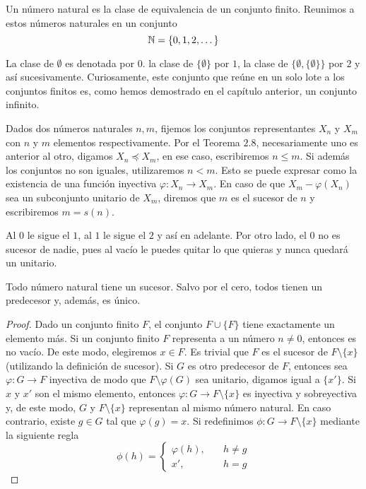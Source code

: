 \documentclass[main.tex]{subfiles}
\begin{document}
\begin{defn}
    Un n\'umero natural es la clase de equivalencia de un conjunto finito. Reunimos a estos n\'umeros naturales en un conjunto
    $$\mathbb N = \{0, 1, 2, \dots\}$$
\end{defn}

La clase de $\emptyset$ es denotada por $0$. la clase de $\{\emptyset\}$ por $1$, la clase de $\{\emptyset, \{\emptyset\}\}$ por $2$ y as\'i sucesivamente. Curiosamente, este conjunto que re\'une en un solo lote a los conjuntos finitos es, como hemos demostrado en el cap\'itulo anterior, un conjunto infinito.

\begin{defn}
    Dados dos n\'umeros naturales $n, m$, fijemos los conjuntos representantes $X_n$ y $X_m$ con $n$ y $m$ elementos respectivamente. Por el Teorema $2.8$, necesariamente uno es anterior al otro, digamos $X_n \preceq X_m$, en ese caso, escribiremos $n \leq m$. Si adem\'as los conjuntos no son iguales, utilizaremos $n < m$. Esto se puede expresar como la existencia de una funci\'on inyectiva $\varphi: X_n \to X_m$. En caso de que $X_m - \varphi(X_n)$ sea un subconjunto unitario de $X_m$, diremos que $m$ es el sucesor de $n$ y escribiremos $m = s(n)$.
\end{defn}

\begin{example}
    Al $0$ le sigue el $1$, al $1$ le sigue el $2$ y as\'i en adelante. Por otro lado, el $0$ no es sucesor de nadie, pues al vac\'io le puedes quitar lo que quieras y nunca quedar\'a un unitario.
\end{example}

\begin{theorem}
    Todo n\'umero natural tiene un sucesor. Salvo por el cero, todos tienen un predecesor y, adem\'as, es \'unico.
\end{theorem}

\begin{proof}
    Dado un conjunto finito $F$, el conjunto $F \cup \{F\}$ tiene exactamente un elemento m\'as. Si un conjunto finito $F$ representa a un n\'umero $n \not= 0$, entonces es no vac\'io. De este modo, elegiremos $x \in F$. Es trivial que $F$ es el sucesor de $F \setminus \{x\}$ (utilizando la definici\'on de sucesor). Si $G$ es otro predecesor de $F$, entonces sea $\varphi: G \to F$ inyectiva de modo que $F \setminus \varphi(G)$ sea unitario, digamos igual a $\{x'\}$. Si $x$ y $x'$ son el mismo elemento, entonces $\varphi: G \to F \setminus \{x\}$ es inyectiva y sobreyectiva y, de este modo, $G$ y $F \setminus \{x\}$ representan al mismo n\'umero natural. En caso contrario, existe $g \in G$ tal que $\varphi(g) = x$. Si redefinimos $\phi: G \to F \setminus \{x\}$ mediante la siguiente regla
    \[
        \phi(h) =
        \begin{cases}
            \varphi(h), &\quad h \not= g \\
            x', &\quad h = g 
        \end{cases}
    \]
\end{proof}
\end{document}
